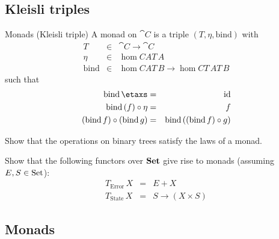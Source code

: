 \documentclass[handout]{beamer}
\begin{document}
\subsection{Kleisli triples}

\begin{frame}
  \begin{block}{Monads (Kleisli triple)}
    A monad on $\cat{C}$ is a triple $(T,\eta,\mathrm{bind})$ with
    \begin{eqnarray*}
      T & \in & \cat{C} \to \cat{C}\\
      \eta & \in & \hom{C}{A}{T\,A}\\
      \mathrm{bind} & \in & \hom{C}{A}{T\,B} \to \hom{C}{T\,A}{T\,B}
    \end{eqnarray*}
    such that 
    \begin{eqnarray*}
      \mathrm{bind}\,\etaxs &= & \id\\
      \mathrm{bind}\,(f) \circ \eta &= & f\\
      (\mathrm{bind}\,f) \circ (\mathrm{bind}\,g) &=& \mathrm{bind}\,((\mathrm{bind}\,f) \circ g)
      \end{eqnarray*}

  \end{block}

  \begin{exercise}
    Show that the operations on binary trees satisfy the laws of a monad.
  \end{exercise}
\end{frame}

\begin{frame}
    \begin{exercise}
    Show that the following functors over $\mathbf{Set}$ give rise to monads
    (assuming $E,S\in\mathrm{Set}$):
    \begin{eqnarray*}
      T_{\mathrm{Error}}\,X & = & E+X\\
      T_{\mathrm{State}}\,X & = & S \to (X\times S)
    \end{eqnarray*}
  \end{exercise}
\end{frame}

\subsection{Monads}
\end{document}
